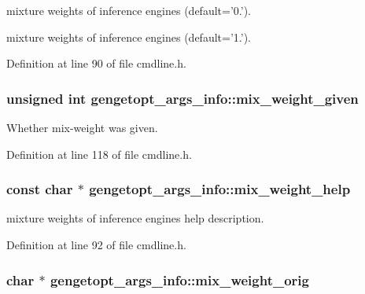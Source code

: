 mixture weights of inference engines (default='0.'). 

mixture weights of inference engines (default='1.'). 

Definition at line 90 of file cmdline.\+h.

\hypertarget{structgengetopt__args__info_ab6cdb68b59a319ba28d96f0e1899f720}{
\subsubsection[{mix\+\_\+weight\+\_\+given}]{\setlength{\rightskip}{0pt plus 5cm}unsigned int gengetopt\+\_\+args\+\_\+info\+::mix\+\_\+weight\+\_\+given}}\label{structgengetopt__args__info_ab6cdb68b59a319ba28d96f0e1899f720}


Whether mix-\/weight was given. 



Definition at line 118 of file cmdline.\+h.

\hypertarget{structgengetopt__args__info_ab851e0e7b97a8147581e5ef2407d000b}{
\subsubsection[{mix\+\_\+weight\+\_\+help}]{\setlength{\rightskip}{0pt plus 5cm}const char $\ast$ gengetopt\+\_\+args\+\_\+info\+::mix\+\_\+weight\+\_\+help}}\label{structgengetopt__args__info_ab851e0e7b97a8147581e5ef2407d000b}


mixture weights of inference engines help description. 



Definition at line 92 of file cmdline.\+h.

\hypertarget{structgengetopt__args__info_a4c5708197ebf9d7e52ea2a2b7988b5b8}{
\subsubsection[{mix\+\_\+weight\+\_\+orig}]{\setlength{\rightskip}{0pt plus 5cm}char $\ast$ gengetopt\+\_\+args\+\_\+info\+::mix\+\_\+weight\+\_\+orig}}\label{structgengetopt__args__info_a4c5708197ebf9d7e52ea2a2b7988b5b8}


